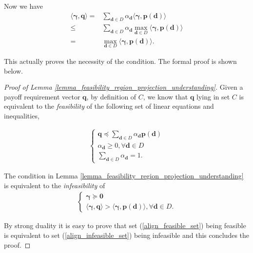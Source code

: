 \documentclass[prodmode,acmtompecs]{acmsmall}
\newcommand{\reqvec}{\mathbf{q}}
\begin{document}
Now we have
\begin{align*}
\langle \boldsymbol{\gamma}, \reqvec \rangle = & \sum\limits_{\mathbf{d} \in D} \alpha_{\mathbf{d}} \langle \boldsymbol{\gamma}, \mathbf{p}(\mathbf{d}) \rangle \\
\leq & \sum\limits_{\mathbf{d} \in D} \alpha_{\mathbf{d}} \max\limits_{\mathbf{d} \in D} \langle \boldsymbol{\gamma}, \mathbf{p}(\mathbf{d}) \rangle	\\
= & \max\limits_{\mathbf{d} \in D} \langle \boldsymbol{\gamma}, \mathbf{p}(\mathbf{d}) \rangle. 
\end{align*}

This actually proves the necessity of the condition. The formal proof is shown below. 

\begin{proof}[Proof of Lemma \ref{lemma_feasibility_region_projection_understanding}]
Given a payoff requirement vector $\reqvec$, by definition of $C$, we know that $\reqvec$ lying in set $C$ is equivalent to the {\em feasibility} of the following set of linear equations and inequalities, 

\begin{align}
\label{align_feasible_set}
\left\{ 
   \begin{array}{l}
     \reqvec \preceq \sum\limits_{\mathbf{d} \in D} \alpha_{\mathbf{d}} \mathbf{p}(\mathbf{d}) \\
     \alpha_{\mathbf{d}} \geq 0, \forall \mathbf{d} \in D	\\
     \sum\limits_{\mathbf{d} \in D} \alpha_{\mathbf{d}} = 1. 
   \end{array} 
\right.
\end{align}

The condition in Lemma \ref{lemma_feasibility_region_projection_understanding} is equivalent to the {\em infeasibility} of 
\begin{align}
\label{align_infeasible_set}
\left\{ 
   \begin{array}{l}
     \boldsymbol{\gamma} \succeq \mathbf{0} \\
     \langle \boldsymbol{\gamma},\reqvec \rangle > \langle \boldsymbol{\gamma}, \mathbf{p}(\mathbf{d}) \rangle, \forall \mathbf{d} \in D. 
   \end{array} 
\right.
\end{align}

By strong duality \cite{BoV09} it is easy to prove that set (\ref{align_feasible_set}) being feasible is equivalent to set (\ref{align_infeasible_set}) being infeasible and this concludes the proof. 
\end{proof}
\end{document}
